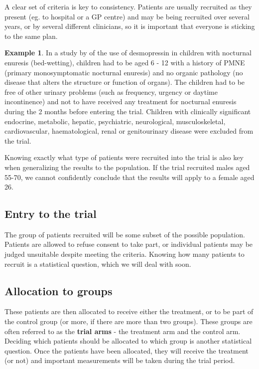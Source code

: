 \documentclass[
  openany]{book}
\theoremstyle{definition}
\theoremstyle{definition}
\newtheorem{example}{Example}[chapter]
\theoremstyle{definition}
\theoremstyle{definition}
\theoremstyle{remark}
\begin{document}
A clear set of criteria is key to consistency. Patients are usually recruited as they present (eg. to hospital or a GP centre) and may be being recruited over several years, or by several different clinicians, so it is important that everyone is sticking to the same plan.

\begin{example}
In a study by \citet{hjalmas1998enuresis} of the use of desmopressin in children with nocturnal enuresis (bed-wetting), children had to be aged 6 - 12 with a history of PMNE (primary monosymptomatic nocturnal enuresis) and no organic pathology (no disease that alters the structure or function of organs). The children had to be free of other urinary problems (such as frequency, urgency or daytime incontinence) and not to have received any treatment for nocturnal enuresis during the 2 months before entering the trial. Children with clinically significant endocrine,
metabolic, hepatic, psychiatric, neurological, musculoskeletal, cardiovascular, haematological, renal or genitourinary disease were excluded from the trial.
\end{example}

Knowing exactly what type of patients were recruited into the trial is also key when generalizing the results to the population. If the trial recruited males aged 55-70, we cannot confidently conclude that the results will apply to a female aged 26.

\hypertarget{entry-to-the-trial}{%
\subsection*{Entry to the trial}\label{entry-to-the-trial}}

The group of patients recruited will be some subset of the possible population. Patients are allowed to refuse consent to take part, or individual patients may be judged unsuitable despite meeting the criteria. Knowing how many patients to recruit is a statistical question, which we will deal with soon.

\hypertarget{allocation-to-groups}{%
\subsection*{Allocation to groups}\label{allocation-to-groups}}

These patients are then allocated to receive either the treatment, or to be part of the control group (or more, if there are more than two groups). These groups are often referred to as the \textbf{trial arms} - the treatment arm and the control arm. Deciding which patients should be allocated to which group is another statistical question. Once the patients have been allocated, they will receive the treatment (or not) and important measurements will be taken during the trial period.
\end{document}
